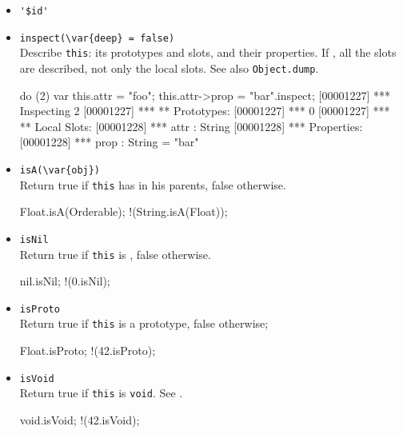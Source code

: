 \begin{itemize}
\item \lstinline|'$id'|\\ %

\item \lstinline|inspect(\var{deep} = false)|\\
  Describe \lstinline|this|: its prototypes and slots, and their
  properties.  If , all the slots are described, not only
  the local slots. See also \lstinline|Object.dump|.
\begin{urbiscript}[firstnumber=last]
do (2) { var this.attr = "foo"; this.attr->prop = "bar"}.inspect;
[00001227] *** Inspecting 2
[00001227] *** ** Prototypes:
[00001227] ***   0
[00001227] *** ** Local Slots:
[00001228] ***   attr : String
[00001228] ***     Properties:
[00001228] ***      prop : String = "bar"
\end{urbiscript}

\item \lstinline|isA(\var{obj})|\\
  Return true if \lstinline|this| has  in his parents, false
  otherwise.

\begin{urbiassert}[firstnumber=last]
Float.isA(Orderable);
!(String.isA(Float));
\end{urbiassert}

\item \lstinline|isNil|\\
  Return true if \lstinline|this| is , false otherwise.

\begin{urbiassert}[firstnumber=last]
nil.isNil;
!(0.isNil);
\end{urbiassert}

\item \lstinline|isProto|\\
  Return true if \lstinline|this| is a prototype, false otherwise;

\begin{urbiassert}[firstnumber=last]
Float.isProto;
!(42.isProto);
\end{urbiassert}

\item \lstinline|isVoid|\\
  Return true if \lstinline|this| is \lstinline|void|.  See
  .
\begin{urbiassert}[firstnumber=last]
void.isVoid;
!(42.isVoid);
\end{urbiassert}


\end{itemize}
